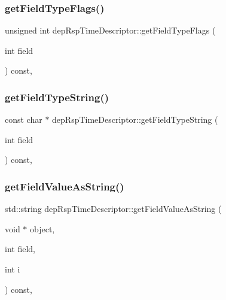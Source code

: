 \subsubsection{\texorpdfstring{get\+Field\+Type\+Flags()}{getFieldTypeFlags()}}
{\footnotesize\ttfamily unsigned int dep\+Rsp\+Time\+Descriptor\+::get\+Field\+Type\+Flags (\begin{DoxyParamCaption}\item[{int}]{field }\end{DoxyParamCaption}) const\hspace{0.3cm}{\ttfamily [override]}, {\ttfamily [virtual]}}

\mbox{\label{classdepRspTimeDescriptor_a230884891fa25dd60490fbf1b72dd5ab}} 
\subsubsection{\texorpdfstring{get\+Field\+Type\+String()}{getFieldTypeString()}}
{\footnotesize\ttfamily const char $\ast$ dep\+Rsp\+Time\+Descriptor\+::get\+Field\+Type\+String (\begin{DoxyParamCaption}\item[{int}]{field }\end{DoxyParamCaption}) const\hspace{0.3cm}{\ttfamily [override]}, {\ttfamily [virtual]}}

\mbox{\label{classdepRspTimeDescriptor_acdc1e2c5d57b9ade8cdd45472ca82719}} 
\subsubsection{\texorpdfstring{get\+Field\+Value\+As\+String()}{getFieldValueAsString()}}
{\footnotesize\ttfamily std\+::string dep\+Rsp\+Time\+Descriptor\+::get\+Field\+Value\+As\+String (\begin{DoxyParamCaption}\item[{void $\ast$}]{object,  }\item[{int}]{field,  }\item[{int}]{i }\end{DoxyParamCaption}) const\hspace{0.3cm}{\ttfamily [override]}, {\ttfamily [virtual]}}

